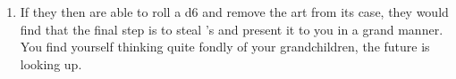 \documentclass[green]{LRSguildcamp1}
\begin{document}
\begin{enumerate}

\item If they then are able to roll a d6 and remove the art from its case, they would find that the final step is to steal \cOS{}'s \iBagofHolding{} and present it to you in a grand manner. You find yourself thinking quite fondly of your grandchildren, the future is looking up. 
\end{enumerate}
\end{document}
